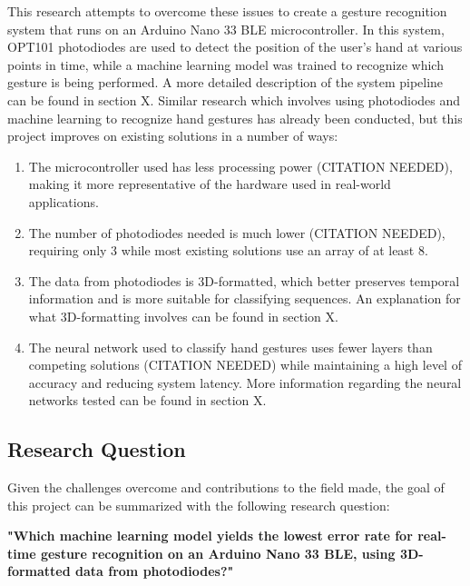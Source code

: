 This research attempts to overcome these issues to create a gesture recognition system that runs on an Arduino Nano 33 BLE microcontroller.
In this system, OPT101 photodiodes are used to detect the position of the user's hand at various points in time, while a machine learning model was trained to recognize which gesture is being performed.
A more detailed description of the system pipeline can be found in section X\@.
Similar research which involves using photodiodes and machine learning to recognize hand gestures has already been conducted, but this project improves on existing solutions in a number of ways:
\begin{enumerate}
    \item The microcontroller used has less processing power (CITATION NEEDED), making it more representative of the hardware used in real-world applications.
    \item The number of photodiodes needed is much lower (CITATION NEEDED), requiring only 3 while most existing solutions use an array of at least 8.
    \item The data from photodiodes is 3D-formatted, which better preserves temporal information and is more suitable for classifying sequences.
    An explanation for what 3D-formatting involves can be found in section X\@.
    \item The neural network used to classify hand gestures uses fewer layers than competing solutions (CITATION NEEDED) while maintaining a high level of accuracy and reducing system latency.
    More information regarding the neural networks tested can be found in section X\@.
\end{enumerate}

\subsection{Research Question}\label{subsec:research-question}
Given the challenges overcome and contributions to the field made, the goal of this project can be summarized with the following research question:

\textbf{"Which machine learning model yields the lowest error rate for real-time gesture recognition on an Arduino Nano 33 BLE, using 3D-formatted data from photodiodes?"}

